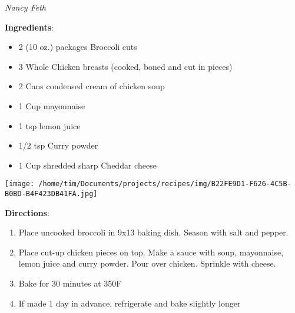\documentclass[11pt, twoside, openany]{book}
\begin{document}
 \label{broccoli-chicken-casserole}\hfill\textit{Nancy Feth}\\
\begin{minipage}[t]{0.8\linewidth}
\textbf{Ingredients}:\vspace{-3mm}
\begin{multicols}{2}
\begin{itemize}\setlength\itemsep{-1mm}
\item 2 (10 oz.) packages Broccoli cuts
\item 3 Whole Chicken breasts (cooked, boned and cut in pieces)
\item 2 Cans condensed cream of chicken soup
\item 1 Cup mayonnaise
\item 1 tsp lemon juice
\item 1/2 tsp Curry powder
\item 1 Cup shredded sharp Cheddar cheese
\end{itemize}
\end{multicols}
\end{minipage}
\begin{minipage}[t]{0.2\linewidth}
\centering \strut\vspace*{-\baselineskip}\newline
\texttt{[image: /home/tim/Documents/projects/recipes/img/B22FE9D1-F626-4C5B-B0BD-B4F423DB41FA.jpg]}\\
\end{minipage}\vspace{3mm}
\textbf{Directions}:
\vspace{-3mm}\begin{enumerate}\setlength\itemsep{-1mm}
\item Place uncooked broccoli in 9x13 baking dish. Season with salt and pepper.
\item Place cut-up chicken pieces on top. Make a sauce with soup, mayonnaise, lemon juice and curry powder. Pour over chicken. Sprinkle with cheese.
\item Bake for 30 minutes at 350F
\item If made 1 day in advance, refrigerate and bake slightly longer
\end{enumerate}
 \label{almond-macaroons}\hfill\textit{}\\
\end{document}
